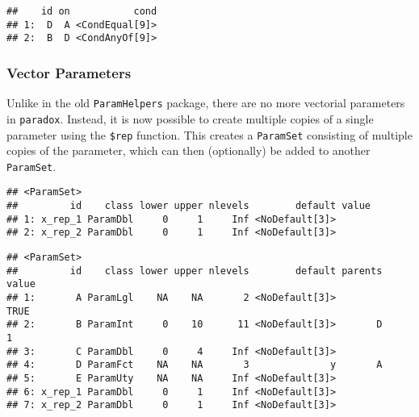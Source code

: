 \documentclass[
]{scrbook}
\newenvironment{Shaded}{\begin{snugshade}}{\end{snugshade}}
\newcommand{\AttributeTok}[1]{\textcolor[rgb]{0.77,0.63,0.00}{#1}}
\newcommand{\DecValTok}[1]{\textcolor[rgb]{0.00,0.00,0.81}{#1}}
\newcommand{\FunctionTok}[1]{\textcolor[rgb]{0.00,0.00,0.00}{#1}}
\newcommand{\NormalTok}[1]{#1}
\newcommand{\OtherTok}[1]{\textcolor[rgb]{0.56,0.35,0.01}{#1}}
\newcommand{\SpecialCharTok}[1]{\textcolor[rgb]{0.00,0.00,0.00}{#1}}
\newcommand{\StringTok}[1]{\textcolor[rgb]{0.31,0.60,0.02}{#1}}
\renewenvironment{Shaded} {\begin{snugshade}\small} {\end{snugshade}}
\begin{document}
\begin{Shaded}
\end{Shaded}

\begin{verbatim}
##    id on           cond
## 1:  D  A <CondEqual[9]>
## 2:  B  D <CondAnyOf[9]>
\end{verbatim}

\hypertarget{vector-parameters}{%
\subsubsection{Vector Parameters}\label{vector-parameters}}

Unlike in the old \texttt{ParamHelpers} package, there are no more vectorial parameters in \texttt{paradox}.
Instead, it is now possible to create multiple copies of a single parameter using the \texttt{\$rep} function.
This creates a \texttt{ParamSet} consisting of multiple copies of the parameter, which can then (optionally) be added to another \texttt{ParamSet}.

\begin{Shaded}
\end{Shaded}

\begin{verbatim}
## <ParamSet>
##         id    class lower upper nlevels        default value
## 1: x_rep_1 ParamDbl     0     1     Inf <NoDefault[3]>      
## 2: x_rep_2 ParamDbl     0     1     Inf <NoDefault[3]>
\end{verbatim}

\begin{Shaded}
\end{Shaded}

\begin{verbatim}
## <ParamSet>
##         id    class lower upper nlevels        default parents value
## 1:       A ParamLgl    NA    NA       2 <NoDefault[3]>          TRUE
## 2:       B ParamInt     0    10      11 <NoDefault[3]>       D     1
## 3:       C ParamDbl     0     4     Inf <NoDefault[3]>              
## 4:       D ParamFct    NA    NA       3              y       A      
## 5:       E ParamUty    NA    NA     Inf <NoDefault[3]>              
## 6: x_rep_1 ParamDbl     0     1     Inf <NoDefault[3]>              
## 7: x_rep_2 ParamDbl     0     1     Inf <NoDefault[3]>
\end{verbatim}
\end{document}
